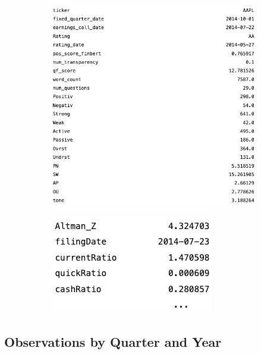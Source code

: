 \documentclass{article}[11pt]
\begin{document}
    \begin{figure}[h]
        \caption{Apple Inc., October 1, 2014}
        \begin{subfigure}[h]{0.4925\textwidth}
            \centering
            \includegraphics[width=0.95\hsize]{../Output/NLP/aapl nlp.png}
        \end{subfigure}
        \begin{subfigure}[h]{0.4925\textwidth}
            \centering
            \includegraphics[width=0.5\hsize]{../Output/NLP/aapl fin.png}
        \end{subfigure}
        \hfill
        \label{fig:one-obs-final-data}
    \end{figure}

    \clearpage
    \newpage

    \subsection{Observations by Quarter and Year}
\end{document}
